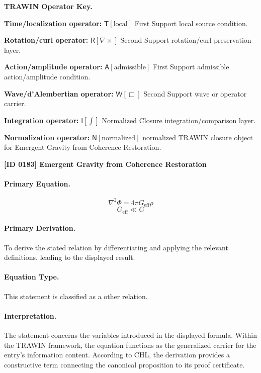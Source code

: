 \par\vspace{0.45\baselineskip}
\noindent\begin{minipage}[t]{\linewidth}
\begingroup
\small
\raggedright
\textbf{TRAWIN Operator Key.}\par
\noindent\textbf{Time/localization operator:} $\mathsf{T}\!\left[\mathrm{local}\right]$ First Support local source condition.\par
\noindent\textbf{Rotation/curl operator:} $\mathsf{R}\!\left[\nabla\times\right]$ Second Support rotation/curl preservation layer.\par
\noindent\textbf{Action/amplitude operator:} $\mathsf{A}\!\left[\mathrm{admissible}\right]$ First Support admissible action/amplitude condition.\par
\noindent\textbf{Wave/d'Alembertian operator:} $\mathsf{W}\!\left[\Box\right]$ Second Support wave or operator carrier.\par
\noindent\textbf{Integration operator:} $\mathsf{I}\!\left[\int\right]$ Normalized Closure integration/comparison layer.\par
\noindent\textbf{Normalization operator:} $\mathsf{N}\!\left[\mathrm{normalized}\right]$ normalized TRAWIN closure object for Emergent Gravity from Coherence Restoration.\par
\endgroup
\end{minipage}

\clearpage
\noindent\textbf{[ID 0183] Emergent Gravity from Coherence Restoration}\par
\vspace{0.35em}
\paragraph{Primary Equation.}
\[
\nabla^2 \Phi = 4\pi G_{\mathrm{eff}}\rho
\]
\[
G_{\mathrm{eff}} \ll G
\]

\paragraph{Primary Derivation.}
To derive the stated relation by differentiating and applying the relevant definitions. leading to the displayed result.
\paragraph{Equation Type.}
This statement is classified as a other relation.

\paragraph{Interpretation.}
The statement concerns the variables introduced in the displayed formula. Within the TRAWIN framework, the equation functions as the generalized carrier for the entry’s information content. According to CHL, the derivation provides a constructive term connecting the canonical proposition to its proof certificate.


